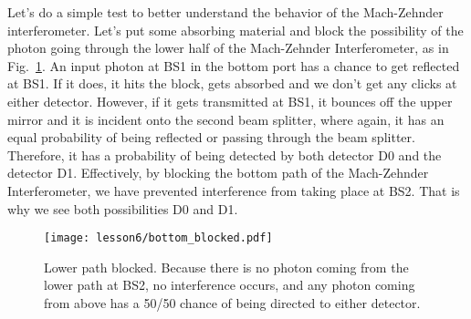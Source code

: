 Let's do a simple test to better understand the behavior of the Mach-Zehnder interferometer.
Let's put some absorbing material and block the possibility of the photon going through the lower half of the Mach-Zehnder Interferometer, as in Fig.~\ref{fig:m-z-blocked}.
An input photon at BS1 in the bottom port has a chance to get reflected at BS1.
If it does, it hits the block, gets absorbed and we don't get any clicks at either detector.
However, if it gets transmitted at BS1, it bounces off the upper mirror and it is incident onto the second beam splitter, where again, it has an equal probability of being reflected or passing through the beam splitter.
Therefore, it has a probability of being detected by both detector D0 and the detector D1.
Effectively, by blocking the bottom path of the Mach-Zehnder Interferometer, we have prevented interference from taking place at BS2.
That is why we see both possibilities D0 and D1.
\begin{figure}[t]
   \centering
    \texttt{[image: lesson6/bottom\_blocked.pdf]}
    \caption[Lower path blocked.]{Lower path blocked. Because there is no photon coming from the lower path at BS2, no interference occurs, and any photon coming from above has a 50/50 chance of being directed to either detector.}
    \label{fig:m-z-blocked}
\end{figure}


